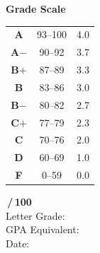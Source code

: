 \documentclass[11pt,a4paper]{article}
\begin{document}
\begin{minipage}[t]{0.48\textwidth}
  \begin{scalegradebox}
    \begin{center}
      {\small\bfseries\textcolor{primary}{Grade Scale}}\\[6pt]
      \renewcommand{\arraystretch}{1.35}
      \begin{tabular}{@{}c c c@{}}
        \textbf{A}  & 93--100 & 4.0 \\
        \textbf{A$-$} & 90--92  & 3.7 \\
        \textbf{B$+$} & 87--89  & 3.3 \\
        \textbf{B}  & 83--86  & 3.0 \\
        \textbf{B$-$} & 80--82  & 2.7 \\
        \textbf{C$+$} & 77--79  & 2.3 \\
        \textbf{C}  & 70--76  & 2.0 \\
        \textbf{D}  & 60--69  & 1.0 \\
        \textbf{F}  & 0--59   & 0.0 \\
      \end{tabular}
    \end{center}
  \end{scalegradebox}
\end{minipage}%
\hfill
\begin{minipage}[t]{0.48\textwidth}
  \begin{tcolorbox}[
    colback=lightbg,
    colframe=accent!40,
    sharp corners,
    boxrule=0.5pt,
    left=10pt, right=10pt, top=8pt, bottom=8pt,
    height=6.5cm,
    valign=center
  ]
    \begin{center}
      \vspace{4pt}
      {\LARGE\bfseries\textcolor{primary}{\phantom{XX}\,/\,100}}\\[8pt]
      {\large\textcolor{accent}{Letter Grade:\ \ \phantom{XXX}}}\\[6pt]
      {\normalsize\textcolor{darktext}{GPA Equivalent:\ \ \phantom{X.XX}}}\\[6pt]
      {\small\textcolor{accent!70}{Date:\ \ \phantom{xxxxxxxxxxxxxxx}}}
      \vspace{4pt}
    \end{center}
  \end{tcolorbox}
\end{minipage}
\par

\vspace{14pt}
\end{document}
